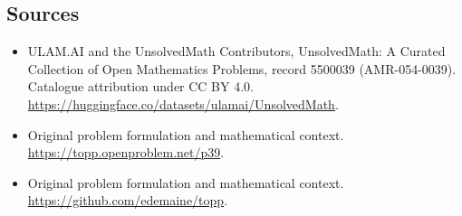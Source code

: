 \documentclass[11pt]{article}
\begin{document}
\subsection{Sources}
\begin{itemize}
\item[\hypertarget{source:5500039:1}{S1}] ULAM.AI and the UnsolvedMath Contributors, UnsolvedMath: A Curated Collection of Open Mathematics Problems, record 5500039 (AMR-054-0039). Catalogue attribution under CC BY 4.0.
\url{https://huggingface.co/datasets/ulamai/UnsolvedMath}.
\item[\hypertarget{source:5500039:2}{S2}] Original problem formulation and mathematical context.
\url{https://topp.openproblem.net/p39}.
\item[\hypertarget{source:5500039:3}{S3}] Original problem formulation and mathematical context.
\url{https://github.com/edemaine/topp}.
\end{itemize}
\label{end:5500039}
\end{document}

